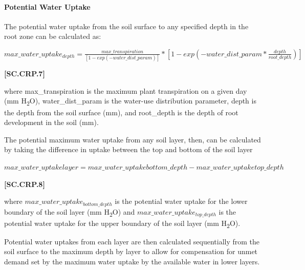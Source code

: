 \paragraph{Potential Water Uptake}
\vspace{-0.25cm}

The potential water uptake from the soil surface to any specified depth in the root zone can be calculated as:
    \vspace{0.2cm}

    \begin{center}
        \(max\_water\_uptake_{depth}=\frac{max\_transpiration}{[1-exp(-water\_dist\_param)]} * [1-exp(-water\_dist\_param * \frac{depth}{root\_depth})]\)
    \end{center}
        \vspace{0.5cm}
    
            {\raggedleft \textbf{[SC.CRP.7]}\par}
            \vspace{0.5cm}

where max\_transpiration is the maximum plant transpiration on a given day (mm H\textsubscript{2}O), water\_dist\_param is the water-use distribution parameter, depth is the depth from the soil surface (mm), and root\_depth is the depth of root development in the soil (mm). 

The potential maximum water uptake from any soil layer, then, can be calculated by taking the difference in uptake between the top and bottom of the soil layer
    \vspace{0.2cm}

    \begin{center}
        \(max\_water\_uptakelayer=max\_water\_uptakebottom\_depth-max\_water\_uptaketop\_depth\)
    \end{center}
        \vspace{0.5cm}
    
            {\raggedleft \textbf{[SC.CRP.8]}\par}
            \vspace{0.5cm}

where \(max\_water\_uptake_{bottom\_depth}\) is the potential water uptake for the lower boundary of the soil layer (mm H\textsubscript{2}O) and \(max\_water\_uptake_{top\_depth}\) is the potential water uptake for the upper boundary of the soil layer (mm H\textsubscript{2}O).

Potential water uptakes from each layer are then calculated sequentially from the soil surface to the maximum depth by layer to allow for compensation for unmet demand set by the maximum water uptake by the available water in lower layers. 

